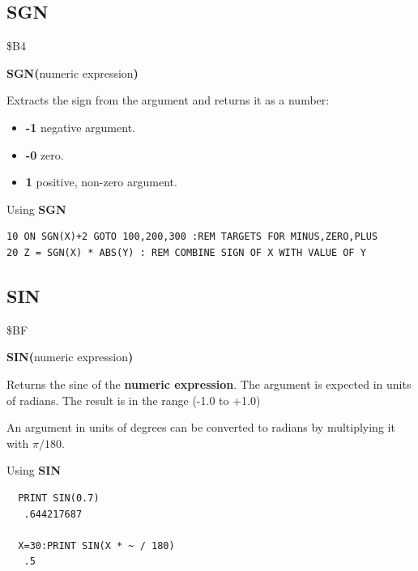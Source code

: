 \subsection{SGN}
\begin{description}[leftmargin=2cm,style=nextline]
\item [Token:] \$B4
\item [Format:] {\bf SGN(}numeric expression{\bf)}
\item [Usage:] Extracts the sign from
               the argument and returns it as a number:

                \begin{itemize}
                    \item {\bf -1} negative argument.
                    \item {\bf -0} zero.
                    \item {\bf 1} positive, non-zero argument.
                \end{itemize}

\item [Example:] Using {\bf SGN}
\begin{tcolorbox}[colback=black,coltext=white]
\verbatimfont{\codefont}
\begin{verbatim}
10 ON SGN(X)+2 GOTO 100,200,300 :REM TARGETS FOR MINUS,ZERO,PLUS
20 Z = SGN(X) * ABS(Y) : REM COMBINE SIGN OF X WITH VALUE OF Y
\end{verbatim}
\end{tcolorbox}
\end{description}


\newpage
\subsection{SIN}
\begin{description}[leftmargin=2cm,style=nextline]
\item [Token:] \$BF
\item [Format:] {\bf SIN(}numeric expression{\bf)}
\item [Usage:] Returns the sine of the {\bf numeric expression}.
               The argument is expected in units of radians.
               The result is in the range (-1.0 to +1.0)

\item [Remarks:] An argument in units of degrees
                 can be converted to radians
               by multiplying it with $\pi/180$.
\item [Examples:] Using {\bf SIN}
\begin{tcolorbox}[colback=black,coltext=white]
\verbatimfont{\codefont}
\begin{verbatim}
  PRINT SIN(0.7)
   .644217687

  X=30:PRINT SIN(X * ~ / 180)
   .5
\end{verbatim}
\end{tcolorbox}
\end{description}

